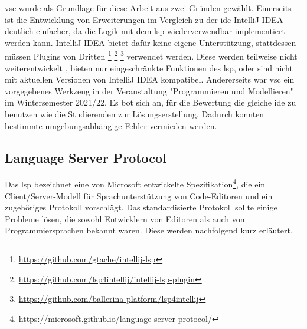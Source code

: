 \ac{vsc} wurde als Grundlage für diese Arbeit aus zwei Gründen gewählt.
Einerseits ist die Entwicklung von Erweiterungen im Vergleich zu der \ac{ide} IntelliJ IDEA deutlich einfacher, da die Logik mit dem \ac{lsp} wiederverwendbar implementiert werden kann.
IntelliJ IDEA bietet dafür keine eigene Unterstützung, stattdessen müssen Plugins von Dritten
\footnote{\url{https://github.com/gtache/intellij-lsp}\label{fn:intellij-lsp}}
\footnote{\url{https://github.com/lsp4intellij/intellij-lsp-plugin}\label{fn:intellij-lsp-plugin}}
\footnote{\url{https://github.com/ballerina-platform/lsp4intellij}\label{fn:lsp4intellij}}
verwendet werden.
Diese werden teilweise nicht weiterentwickelt , bieten nur eingeschränkte Funktionen des \ac{lsp}, oder sind nicht mit aktuellen Versionen von IntelliJ IDEA kompatibel.
Andererseits war \ac{vsc} ein vorgegebenes Werkzeug in der Veranstaltung "Programmieren und Modellieren" im Wintersemester 2021/22.
Es bot sich an, für die Bewertung die gleiche \ac{ide} zu benutzen wie die Studierenden zur Lösungserstellung.
Dadurch konnten bestimmte umgebungsabhängige Fehler vermieden werden.

\subsection{Language Server Protocol}\label{subsec:language-server-protocol}

Das \ac{lsp} bezeichnet eine von Microsoft entwickelte Spezifikation\footnote{\url{https://microsoft.github.io/language-server-protocol/}}, die ein Client/Server-Modell für Sprachunterstützung von Code-Editoren und ein zugehöriges Protokoll vorschlägt.
Das standardisierte Protokoll sollte einige Probleme lösen, die sowohl Entwicklern von Editoren als auch von Programmiersprachen bekannt waren.
Diese werden nachfolgend kurz erläutert.

